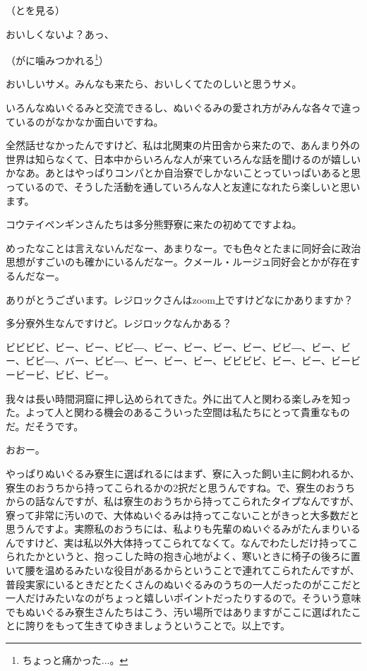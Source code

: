 \documentclass[9pt,4aj]{jsarticle}
\begin{document}
\begin{multicols}{2}
（とを見る）

おいしくないよ？あっ、

（がに噛みつかれる\footnote{ちょっと痛かった...。}）

おいしいサメ。みんなも来たら、おいしくてたのしいと思うサメ。

いろんなぬいぐるみと交流できるし、ぬいぐるみの愛され方がみんな各々で違っているのがなかなか面白いですね。

全然話せなかったんですけど、私は北関東の片田舎から来たので、あんまり外の世界は知らなくて、日本中からいろんな人が来ていろんな話を聞けるのが嬉しいかなあ。あとはやっぱりコンパとか自治寮でしかないことっていっぱいあると思っているので、そうした活動を通していろんな人と友達になれたら楽しいと思います。

コウテイペンギンさんたちは多分熊野寮に来たの初めてですよね。

めったなことは言えないんだなー、あまりなー。でも色々とたまに同好会に政治思想がすごいのも確かにいるんだなー。クメール・ルージュ同好会とかが存在するんだなー。

ありがとうございます。レジロックさんはzoom上ですけどなにかありますか？

多分寮外生なんですけど。レジロックなんかある？

ビビビビ、ビー、ビー、ビビ―、ビー、ビー、ビー、ビー、ビビ―、ビー、ビー、ビビ―、バー、ビビ―、ビー、ビー、ビー、ビビビビ、ビー、ビー、ビービービービ、ビビ、ビー。

我々は長い時間洞窟に押し込められてきた。外に出て人と関わる楽しみを知った。よって人と関わる機会のあるこういった空間は私たちにとって貴重なものだ。だそうです。

おおー。

やっぱりぬいぐるみ寮生に選ばれるにはまず、寮に入った飼い主に飼われるか、寮生のおうちから持ってこられるかの2択だと思うんですね。で、寮生のおうちからの話なんですが、私は寮生のおうちから持ってこられたタイプなんですが、寮って非常に汚いので、大体ぬいぐるみは持ってこないことがきっと大多数だと思うんですよ。実際私のおうちには、私よりも先輩のぬいぐるみがたんまりいるんですけど、実は私以外大体持ってこられてなくて。なんでわたしだけ持ってこられたかというと、抱っこした時の抱き心地がよく、寒いときに椅子の後ろに置いて腰を温めるみたいな役目があるからということで連れてこられたんですが、普段実家にいるときだとたくさんのぬいぐるみのうちの一人だったのがここだと一人だけみたいなのがちょっと嬉しいポイントだったりするので。そういう意味でもぬいぐるみ寮生さんたちはこう、汚い場所ではありますがここに選ばれたことに誇りをもって生きてゆきましょうということで。以上です。


\end{multicols}
\end{document}
